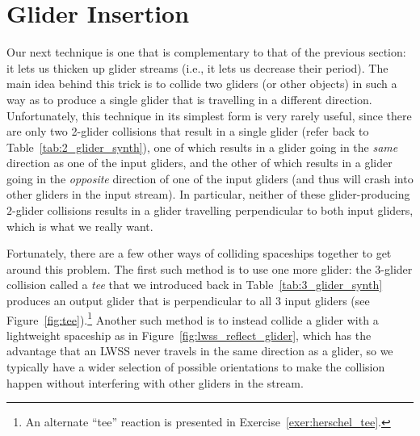 

\section{Glider Insertion}\label{sec:glider_insertion}

Our next technique is one that is complementary to that of the previous section: it lets us thicken up glider streams (i.e., it lets us decrease their period). The main idea behind this trick is to collide two gliders (or other objects) in such a way as to produce a single glider that is travelling in a different direction. Unfortunately, this technique in its simplest form is very rarely useful, since there are only two 2-glider collisions that result in a single glider (refer back to Table~\ref{tab:2_glider_synth}), one of which results in a glider going in the \emph{same} direction as one of the input gliders, and the other of which results in a glider going in the \emph{opposite} direction of one of the input gliders (and thus will crash into other gliders in the input stream). In particular, neither of these glider-producing $2$-glider collisions results in a glider travelling perpendicular to both input gliders, which is what we really want.
%

Fortunately, there are a few other ways of colliding spaceships together to get around this problem. The first such method is to use one more glider: the $3$-glider collision called a \emph{tee} that we introduced back in Table~\ref{tab:3_glider_synth} produces an output glider that is perpendicular to all $3$ input gliders (see Figure~\ref{fig:tee}).\footnote{An alternate ``tee'' reaction is presented in Exercise~\ref{exer:herschel_tee}.} Another such method is to instead collide a glider with a lightweight spaceship as in Figure~\ref{fig:lwss_reflect_glider}, which has the advantage that an LWSS never travels in the same direction as a glider, so we typically have a wider selection of possible orientations to make the collision happen without interfering with other gliders in the stream.

